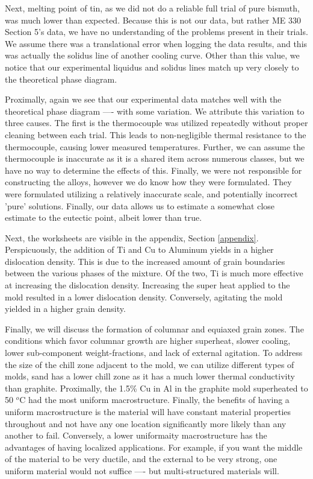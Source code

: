 \documentclass{article}
\begin{document}
Next, melting point of tin, as we did not do a reliable full trial of  pure bismuth, was much lower than expected. Because this is not our data, but rather ME 330 Section 5's data, we have no understanding of the problems present in their trials. We assume there was a translational error when logging the data results, and this was actually the solidus line of another cooling curve. Other than this value, we notice that our experimental liquidus and solidus lines match up very closely to the theoretical phase diagram. 

Proximally, again we see that our experimental data matches well with the theoretical phase diagram ---- with some variation. We attribute this variation to three causes. The first is the thermocouple was utilized repeatedly without proper cleaning between each trial. This leads to non-negligible thermal resistance to the thermocouple, causing lower measured temperatures. Further, we can assume the thermocouple is inaccurate as it is a shared item across numerous classes, but we have no way to determine the effects of this. Finally, we were not responsible for constructing the alloys, however we do know how they were formulated. They were formulated utilizing a relatively inaccurate scale, and potentially incorrect 'pure' solutions. Finally, our data allows us to estimate a somewhat close estimate to the eutectic point, albeit lower than true. 

Next, the worksheets are visible in the appendix, Section \ref{appendix}. Perspicuously, the addition of Ti and Cu to Aluminum yields in a higher dislocation density. This is due to the increased amount of grain boundaries between the various phases of the mixture. Of the two, Ti is much more effective at increasing the dislocation density. Increasing the super heat applied to the mold resulted in a lower dislocation density. Conversely, agitating the mold yielded in a higher grain density. 

Finally, we will discuss the formation of columnar and equiaxed grain zones. The conditions which favor columnar growth are higher superheat, slower cooling, lower sub-component weight-fractions, and lack of external agitation. To address the size of the chill zone adjacent to the mold, we can utilize different types of molds, sand has a lower chill zone as it has a much lower thermal conductivity than graphite. Proximally, the 1.5\% Cu in Al in the graphite mold superheated to 50 $^o$C had the most uniform macrostructure. Finally, the benefits of having a uniform macrostructure is the material will have constant material properties throughout and not have any one location significantly more likely than any another to fail. Conversely, a lower uniformaity macrostructure has the advantages of having localized applications. For example, if you want the middle of the material to be very ductile, and the external to be very strong, one uniform material would not suffice ---- but multi-structured materials will. 
\end{document}
